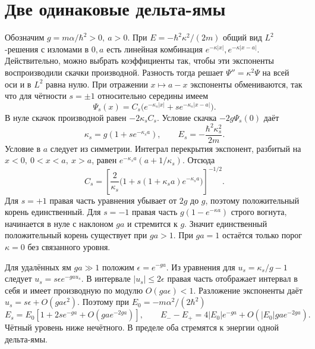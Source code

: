 \documentclass[11pt,a4paper]{article}
\begin{document}
\section{Две одинаковые дельта-ямы}

Обозначим \(g=m\alpha/\hbar^2>0,\ a>0\).
При \(E=-\hbar^2\kappa^2/(2m)\) общий вид \(L^2\)-решения с
изломами в \(0,a\) есть линейная комбинация
\(e^{-\kappa|x|},e^{-\kappa|x-a|}\). Действительно, можно выбрать
коэффициенты так, чтобы эти экспоненты воспроизводили скачки
производной. Разность тогда решает \(\Psi''=\kappa^2\Psi\)
на всей оси и в \(L^2\) равна нулю. При отражении \(x\mapsto a-x\)
экспоненты обмениваются, так что для чётности \(s=\pm1\)
относительно середины имеем
\[
 \Psi_s(x)=C_s\bigl(e^{-\kappa_s|x|}+s e^{-\kappa_s|x-a|}\bigr).
\]
В нуле скачок производной равен \(-2\kappa_s C_s\).
Условие скачка \(-2g\Psi_s(0)\) даёт
\[
 \kappa_s=g(1+s e^{-\kappa_s a}),\qquad E_s=-\frac{\hbar^2\kappa_s^2}{2m}.
\]
Условие в \(a\) следует из симметрии. Интеграл перекрытия
экспонент, разбитый на \(x<0,\ 0<x<a,\ x>a\), равен
\(e^{-\kappa_s a}(a+1/\kappa_s)\). Отсюда
\[
 C_s=\left[\frac{2}{\kappa_s}
           \bigl(1+s(1+\kappa_s a)e^{-\kappa_s a}\bigr)\right]^{-1/2}.
\]
Для \(s=+1\) правая часть уравнения убывает от \(2g\) до \(g\),
поэтому положительный корень единственный. Для \(s=-1\) правая
часть \(g(1-e^{-\kappa a})\) строго вогнута, начинается в нуле
с наклоном \(ga\) и стремится к \(g\).
Значит единственный положительный корень существует при \(ga>1\).
При \(ga=1\) остаётся только порог \(\kappa=0\) без связанного уровня.

Для удалённых ям \(ga\gg1\) положим \(\epsilon=e^{-ga}\).
Из уравнения для \(u_s=\kappa_s/g-1\) следует
\(u_s=s\epsilon e^{-ga u_s}\).
В интервале \(|u_s|\le2\epsilon\) правая часть отображает интервал
в себя и имеет производную по модулю \(O(ga\epsilon)<1\).
Разложение экспоненты даёт \(u_s=s\epsilon+O(ga\epsilon^2)\).
Поэтому при \(E_0=-m\alpha^2/(2\hbar^2)\)
\[
 E_s=E_0[1+2s e^{-ga}+O(ga e^{-2ga})],\qquad
 E_--E_+=4|E_0|e^{-ga}+O(|E_0|ga e^{-2ga}).
\]
Чётный уровень ниже нечётного. В пределе оба стремятся
к энергии одной дельта-ямы.
\end{document}
